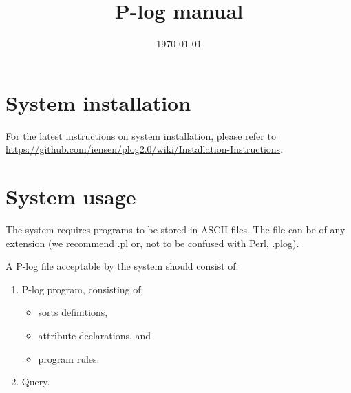 \documentclass[12pt, letterpaper]{article}
\begin{document}
\newcommand{\hide}[1]{}
\newcommand{\exercise}[1]{}
\newcommand{\future}[1]{}
\newcommand{\otherquestions}[1]{}
\newcommand{\set}[1]{\{#1\}}
\newcommand{\pg}[1]{{\tt #1}}
\newtheorem{definition}{Definition}
\newcommand{\emptyclause}{\Box}
\def\st{\bigskip\noindent}
\newcommand{\lplus}
{
   \stackrel{+}{\gets}
}

\newcommand{\fe}[1] {
  \begin{frame}
    #1
  \end{frame}}

\newcommand{\eoa}{ {\bf End} of algorithm}

\newcommand{\ft}[1] {\frametitle{#1}}

\newcommand{\ie}[1] {
  \begin{itemize}
    #1
  \end{itemize}
}

\newcommand{\ee}[1] {
  \begin{enumerate}
    #1
  \end{enumerate}\label{marker}
}
\newcommand{\blk}[2] {
  \begin{block}{#1}
    #2
  \end{block}
}

\newtheorem{collorary}{Corollary}
\newtheorem{proposition}{Proposition}
\newtheorem{invariant}{Invariant}
\newtheorem{property}{Property}
\newtheorem{claim}{Claim}
\newtheorem{example}{Example}


\title{P-log manual}
\date{\today}
\maketitle
\tableofcontents
\pagebreak


\section{System installation}

For the latest instructions on system installation, please refer to \url{https://github.com/iensen/plog2.0/wiki/Installation-Instructions}.
\section{System usage}\label{sysusage}

\medskip\noindent
The system requires programs to be stored in ASCII files.
The file can be of any extension (we recommend .pl or, not to be confused with Perl, .plog).

\medskip\noindent
A P-log file acceptable by the system should consist of:
\begin{enumerate}
\item P-log program, consisting of:
\begin{itemize}
\item sorts definitions,
\item attribute declarations, and
\item program rules.
\end{itemize}
\item Query.
\end{enumerate}
\end{document}
